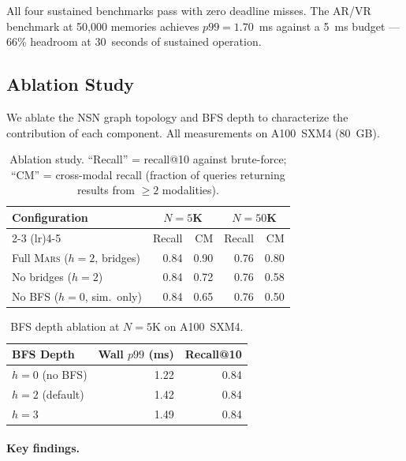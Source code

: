 \documentclass[11pt]{article}
\newcommand{\mars}{\textsc{Mars}}
\begin{document}
All four sustained benchmarks pass with zero deadline misses. The AR/VR
benchmark at 50{,}000 memories achieves $p99 = 1.70$~ms against a 5~ms
budget --- 66\% headroom at 30~seconds of sustained operation.

\subsection{Ablation Study}
\label{sec:ablation}

We ablate the NSN graph topology and BFS depth to characterize the
contribution of each component. All measurements on A100~SXM4 (80~GB).

\begin{table}[ht]
\centering
\small
\caption{Ablation study. ``Recall'' = recall@10 against brute-force;
``CM'' = cross-modal recall (fraction of queries returning results from
$\geq 2$ modalities).}
\label{tab:ablation}
\begin{tabular}{lrrrr}
\toprule
\textbf{Configuration} & \multicolumn{2}{c}{\textbf{$N{=}5$K}} & \multicolumn{2}{c}{\textbf{$N{=}50$K}} \\
\cmidrule(lr){2-3} \cmidrule(lr){4-5}
 & Recall & CM & Recall & CM \\
\midrule
Full \mars{} ($h{=}2$, bridges) & 0.84 & 0.90 & 0.76 & 0.80 \\
No bridges ($h{=}2$)            & 0.84 & 0.72 & 0.76 & 0.58 \\
No BFS ($h{=}0$, sim.\ only)    & 0.84 & 0.65 & 0.76 & 0.50 \\
\bottomrule
\end{tabular}
\end{table}

\begin{table}[ht]
\centering
\small
\caption{BFS depth ablation at $N{=}5$K on A100~SXM4.}
\label{tab:bfs_depth}
\begin{tabular}{lrr}
\toprule
\textbf{BFS Depth} & \textbf{Wall $p99$ (ms)} & \textbf{Recall@10} \\
\midrule
$h{=}0$ (no BFS)   & 1.22 & 0.84 \\
$h{=}2$ (default)   & 1.42 & 0.84 \\
$h{=}3$             & 1.49 & 0.84 \\
\bottomrule
\end{tabular}
\end{table}

\paragraph{Key findings.}
\end{document}
